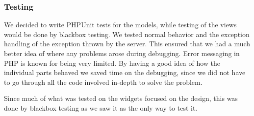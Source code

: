 \subsubsection{Testing}
We decided to write PHPUnit tests for the models, while testing of the views would be done by blackbox testing. We tested normal behavior and the exception handling of the exception thrown by the server. This ensured that we had a much better idea of where any problems arose during debugging. Error messaging in PHP is known for being very limited. By having a good idea of how the individual parts behaved we saved time on the debugging, since we did not have to go through all the code involved in-depth to solve the problem.

Since much of what was tested on the widgets focused on the design, this was done by blackbox testing as we saw it as the only way to test it.